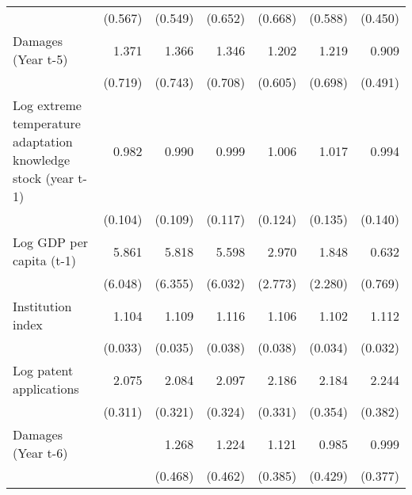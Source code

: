 \begin{table}[htbp]
\begin{tabular}{l*{6}{D{.}{.}{-1}}}
                    &     (0.567)         &     (0.549)         &     (0.652)         &     (0.668)         &     (0.588)         &     (0.450)         \\
\addlinespace
Damages (Year t-5)  &       1.371         &       1.366         &       1.346         &       1.202         &       1.219         &       0.909         \\
                    &     (0.719)         &     (0.743)         &     (0.708)         &     (0.605)         &     (0.698)         &     (0.491)         \\
\addlinespace
Log extreme temperature adaptation knowledge stock (year t-1)&       0.982         &       0.990         &       0.999         &       1.006         &       1.017         &       0.994         \\
                    &     (0.104)         &     (0.109)         &     (0.117)         &     (0.124)         &     (0.135)         &     (0.140)         \\
\addlinespace
Log GDP per capita (t-1)&       5.861\sym{*}  &       5.818\sym{\%}  &       5.598\sym{\%}  &       2.970         &       1.848         &       0.632         \\
                    &     (6.048)         &     (6.355)         &     (6.032)         &     (2.773)         &     (2.280)         &     (0.769)         \\
\addlinespace
Institution index   &       1.104\sym{***}&       1.109\sym{***}&       1.116\sym{***}&       1.106\sym{***}&       1.102\sym{***}&       1.112\sym{***}\\
                    &     (0.033)         &     (0.035)         &     (0.038)         &     (0.038)         &     (0.034)         &     (0.032)         \\
\addlinespace
Log patent applications&       2.075\sym{***}&       2.084\sym{***}&       2.097\sym{***}&       2.186\sym{***}&       2.184\sym{***}&       2.244\sym{***}\\
                    &     (0.311)         &     (0.321)         &     (0.324)         &     (0.331)         &     (0.354)         &     (0.382)         \\
\addlinespace
Damages (Year t-6)  &                     &       1.268         &       1.224         &       1.121         &       0.985         &       0.999         \\
                    &                     &     (0.468)         &     (0.462)         &     (0.385)         &     (0.429)         &     (0.377)         \\

\end{tabular}
\end{table}
